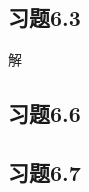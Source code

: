 \documentclass{ctexrep}
\begin{document}
\subsection*{习题6.3}
解

\subsection*{习题6.6}

\subsection*{习题6.7}
\end{document}
